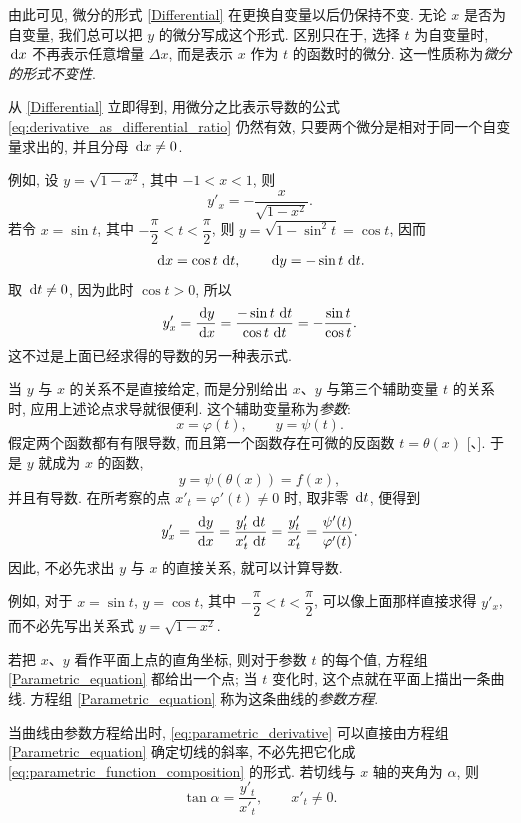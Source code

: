 由此可见, {\kaishu 微分的形式 \eqref{Differential} 在更换自变量以后仍保持不变.
无论 $x$ 是否为自变量, 我们总可以把 $y$ 的微分写成这个形式.}
区别只在于, {\kaishu 选择 $t$ 为自变量时, $\,\mathrm{d} x$ 不再表示任意增量 $\Delta x$,
而是表示 $x$ 作为 $t$ 的函数时的微分.}
这一性质称为\emph{微分的形式不变性}.

从 \eqref{Differential} 立即得到, 用微分之比表示导数的公式
\eqref{eq:derivative_as_differential_ratio} 仍然有效,
只要两个微分是相对于同一个自变量求出的, 并且分母 $\,\mathrm{d} x\neq0$.

例如, 设 $y=\sqrt{1-x^2}$, 其中 $-1<x<1$, 则
$$
y'_x=-\frac{x}{\sqrt{1-x^2}}.
$$
若令 $x=\sin t$, 其中 $-\dfrac\pi2<t<\dfrac\pi2$, 则
$y=\sqrt{1-\sin^2t}=\cos t$, 因而
$$
\,\mathrm{d} x=\cos t\,\,\mathrm{d} t,\qquad \,\mathrm{d} y=-\sin t\,\,\mathrm{d} t.
$$
取 $\,\mathrm{d} t\neq0$, 因为此时 $\cos t>0$, 所以
$$
y'_x=\frac{\,\mathrm{d} y}{\,\mathrm{d} x}
=\frac{-\sin t\,\,\mathrm{d} t}{\cos t\,\,\mathrm{d} t}
=-\frac{\sin t}{\cos t}.
$$
这不过是上面已经求得的导数的另一种表示式.

当 $y$ 与 $x$ 的关系不是直接给定, 而是分别给出 $x$、$y$
与第三个辅助变量 $t$ 的关系时, 应用上述论点求导就很便利.
这个辅助变量称为\emph{参数}:
\begin{equation}\label{Parametric_equation}
x=\varphi(t),\qquad y=\psi(t).
\end{equation}
假定两个函数都有有限导数, 而且第一个函数存在可微的反函数 $t=\theta(x)$
[、].
于是 $y$ 就成为 $x$ 的函数,
\begin{equation}\label{eq:parametric_function_composition}
y=\psi(\theta(x))=f(x),
\end{equation}
并且有导数.
在所考察的点 $x'_t=\varphi'(t)\neq0$ 时, 取非零 $\,\mathrm{d} t$, 便得到
\begin{equation}\label{eq:parametric_derivative}
y'_x=\frac{\,\mathrm{d} y}{\,\mathrm{d} x}
=\frac{y'_t\,\,\mathrm{d} t}{x'_t\,\,\mathrm{d} t}
=\frac{y'_t}{x'_t}
=\frac{\psi'(t)}{\varphi'(t)}.
\end{equation}
因此, 不必先求出 $y$ 与 $x$ 的直接关系, 就可以计算导数.

例如, 对于 $x=\sin t$, $y=\cos t$, 其中 $-\dfrac\pi2<t<\dfrac\pi2$,
可以像上面那样直接求得 $y'_x$, 而不必先写出关系式 $y=\sqrt{1-x^2}$.

若把 $x$、$y$ 看作平面上点的直角坐标, 则对于参数 $t$ 的每个值,
方程组 \eqref{Parametric_equation} 都给出一个点;
当 $t$ 变化时, 这个点就在平面上描出一条曲线.
方程组 \eqref{Parametric_equation} 称为这条曲线的\emph{参数方程}.

当曲线由参数方程给出时, \eqref{eq:parametric_derivative}
可以直接由方程组 \eqref{Parametric_equation} 确定切线的斜率,
不必先把它化成 \eqref{eq:parametric_function_composition} 的形式.
若切线与 $x$ 轴的夹角为 $\alpha$, 则
\begin{equation}\label{eq:parametric_tangent_slope}
\tan\alpha=\frac{y'_t}{x'_t},\qquad x'_t\neq0.
\end{equation}
\par\endgroup

